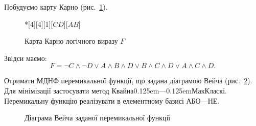 \documentclass[a4paper,oneside,DIV=12,12pt]{scrartcl}
\newcommand{\nbspthin}{\kern 0.125em}
\begin{document}
\begin{solution}
		Побудуємо карту Карно (рис.~\ref{fig:task3-karnaugh-map}).
		\begin{figure}
		\centering
			\begin{karnaugh-map}*[4][4][1][$CD$][$AB$]
			\end{karnaugh-map}
		\caption{Карта Карно логічного виразу $F$}
		\label{fig:task3-karnaugh-map}
		\end{figure}
		Звідси маємо:
		\[
			F = \neg{C} \land \neg{D} \lor A \land B \land D \lor B \land C \land D \lor A \land C \land D.
		\]
	\end{solution}
	
	\begin{exercise}
		Отримати МДНФ перемикальної функції, що задана діаграмою Вейча (рис.~\ref{fig:task4-veitch-diagram}). Для мінімізації застосувати метод Квайна\nbspthin —\nbspthin МакКласкі. Перемикальну функцію реалізувати в елементному базисі АБО---НЕ.
		
		\begin{figure}[!htbp]
		\centering
		\caption{Діаграма Вейча заданої перемикальної функції}
		\label{fig:task4-veitch-diagram}
		\end{figure}
		
	\end{exercise}
	
\end{document}
